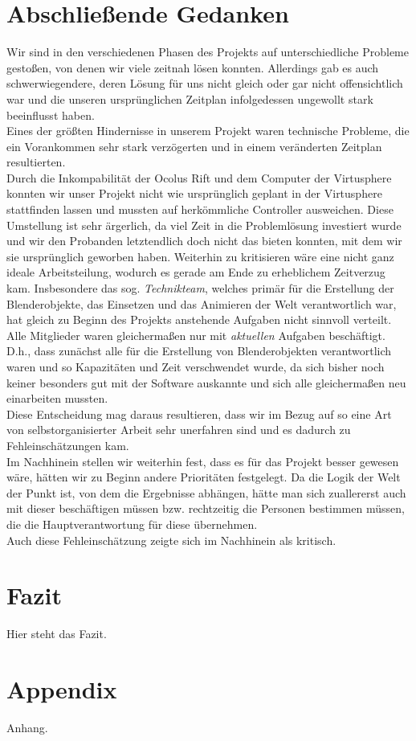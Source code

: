 \documentclass{Bericht}
\begin{document}
\section{Abschließende Gedanken}
Wir sind in den verschiedenen Phasen des Projekts auf unterschiedliche Probleme gestoßen, von denen wir viele zeitnah lösen konnten. Allerdings gab es auch schwerwiegendere, deren Lösung für uns nicht gleich oder gar nicht offensichtlich war und die unseren ursprünglichen Zeitplan infolgedessen ungewollt stark beeinflusst haben.\\
Eines der größten Hindernisse in unserem Projekt waren technische Probleme, die ein Vorankommen sehr stark verzögerten und in einem veränderten Zeitplan resultierten.\\
Durch die Inkompabilität der Ocolus Rift und dem Computer der Virtusphere konnten wir unser Projekt nicht wie ursprünglich geplant in der Virtusphere stattfinden lassen und mussten auf herkömmliche Controller ausweichen. Diese Umstellung ist sehr ärgerlich, da viel Zeit in die Problemlösung investiert wurde und wir den Probanden letztendlich doch nicht das bieten konnten, mit dem wir sie ursprünglich geworben haben. 
Weiterhin zu kritisieren wäre eine nicht ganz ideale Arbeitsteilung, wodurch es gerade am Ende zu erheblichem Zeitverzug kam. Insbesondere das sog. \textit{Technikteam}, welches primär für die Erstellung der Blenderobjekte, das Einsetzen und das Animieren der Welt verantwortlich war, hat gleich zu Beginn des Projekts anstehende Aufgaben nicht sinnvoll verteilt. Alle Mitglieder waren gleichermaßen nur mit \textit{aktuellen} Aufgaben beschäftigt. D.h., dass zunächst alle für die Erstellung von Blenderobjekten verantwortlich waren und so Kapazitäten und Zeit verschwendet wurde, da sich bisher noch keiner besonders gut mit der Software auskannte und sich alle gleichermaßen neu einarbeiten mussten.\\
Diese Entscheidung mag daraus resultieren, dass wir im Bezug auf so eine Art von selbstorganisierter Arbeit sehr unerfahren sind und es dadurch zu Fehleinschätzungen kam.\\
Im Nachhinein stellen wir weiterhin fest, dass es für das Projekt besser gewesen wäre, hätten wir zu Beginn andere Prioritäten festgelegt. Da die Logik der Welt der Punkt ist, von dem die Ergebnisse abhängen, hätte man sich zuallererst auch mit dieser beschäftigen müssen bzw. rechtzeitig die Personen bestimmen müssen, die die Hauptverantwortung für diese übernehmen.\\
Auch diese Fehleinschätzung zeigte sich im Nachhinein als kritisch.
	
\section{Fazit}
	Hier steht das Fazit.
	
\section{Appendix} %
	Anhang.
	
\vfill %

\printbibliography
\end{document}
